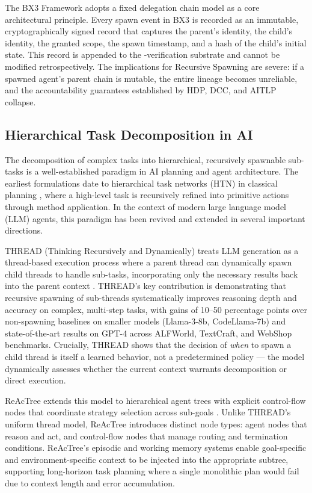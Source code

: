 The BX3 Framework adopts a fixed delegation chain model as a core architectural principle. Every spawn event in BX3 is recorded as an immutable, cryptographically signed record that captures the parent's identity, the child's identity, the granted scope, the spawn timestamp, and a hash of the child's initial state. This record is appended to the \fact-verification substrate and cannot be modified retrospectively. The implications for Recursive Spawning are severe: if a spawned agent's parent chain is mutable, the entire lineage becomes unreliable, and the accountability guarantees established by HDP, DCC, and AITLP collapse.

\subsection{Hierarchical Task Decomposition in AI}

The decomposition of complex tasks into hierarchical, recursively spawnable sub-tasks is a well-established paradigm in AI planning and agent architecture. The earliest formulations date to hierarchical task networks (HTN) in classical planning \citep{erol1994htn}, where a high-level task is recursively refined into primitive actions through method application. In the context of modern large language model (LLM) agents, this paradigm has been revived and extended in several important directions.

THREAD (Thinking Recursively and Dynamically) treats LLM generation as a thread-based execution process where a parent thread can dynamically spawn child threads to handle sub-tasks, incorporating only the necessary results back into the parent context \citep{chen2025thread}. THREAD's key contribution is demonstrating that recursive spawning of sub-threads systematically improves reasoning depth and accuracy on complex, multi-step tasks, with gains of 10–50 percentage points over non-spawning baselines on smaller models (Llama-3-8b, CodeLlama-7b) and state-of-the-art results on GPT-4 across ALFWorld, TextCraft, and WebShop benchmarks. Crucially, THREAD shows that the decision of \emph{when} to spawn a child thread is itself a learned behavior, not a predetermined policy — the model dynamically assesses whether the current context warrants decomposition or direct execution.

ReAcTree extends this model to hierarchical agent trees with explicit control-flow nodes that coordinate strategy selection across sub-goals \citep{li2024reactree}. Unlike THREAD's uniform thread model, ReAcTree introduces distinct node types: agent nodes that reason and act, and control-flow nodes that manage routing and termination conditions. ReAcTree's episodic and working memory systems enable goal-specific and environment-specific context to be injected into the appropriate subtree, supporting long-horizon task planning where a single monolithic plan would fail due to context length and error accumulation.


